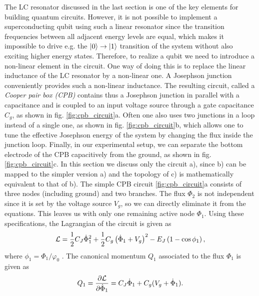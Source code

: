 The LC resonator discussed in the last section is one of the key elements for building quantum circuits. However, it is not possible to implement a superconducting qubit using such a linear resonator since the transition frequencies between all adjacent energy levels are equal, which makes it impossible to drive e.g. the $\left| 0 \right>\to\left| 1 \right>$ transition of the system without also exciting higher energy states. Therefore, to realize a qubit we need to introduce a non-linear element in the circuit. One way of doing this is to replace the linear inductance of the LC resonator by a non-linear one. A Josephson junction conveniently provides such a non-linear inductance. The resulting circuit, called a {\it Cooper pair box (CPB)} contains thus a Josephson junction in parallel with a capacitance and is coupled to an input voltage source through a gate capacitance $C_g$, as shown in fig. \ref{fig:cpb_circuit}a. Often one also uses two junctions in a loop instead of a single one, as shown in fig. \ref{fig:cpb_circuit}b, which allows one to tune the effective Josephson energy of the system by changing the flux inside the junction loop. Finally, in our experimental setup, we can separate the bottom electrode of the CPB capacitively from the ground, as shown in fig. \ref{fig:cpb_circuit}c. In this section we discuss only the circuit a), since b) can be mapped to the simpler version a) and the topology of c) is mathematically equivalent to that of b). The simple CPB circuit \ref{fig:cpb_circuit}a consists of  three nodes (including ground) and two branches. The flux $\Phi_2$ is not independent since it is set by the voltage source $V_g$, so we can directly eliminate it from the equations. This leaves us with only one remaining active node $\Phi_1$. Using these specifications, the Lagrangian of the circuit is given as
%
\begin{equation}
\begin{mathcal}L\end{mathcal}=\frac{1}{2}C_J\dot{\Phi}_1^2+\frac{1}{2}C_g\left(\dot{\Phi}_1+V_g\right)^2-E_J\left(1-\cos{\phi_1}\right),
\end{equation}
%
where $\phi_1=\Phi_1/\varphi_0$ . The canonical momentum $Q_1$ associated to the flux $\Phi_1$ is given as
%
\begin{equation}
Q_1 = \frac{\partial \begin{mathcal}L\end{mathcal}}{\partial \dot{\Phi}_1} = C_J \dot{\Phi}_1+C_g(V_g+\dot{\Phi}_1). \label{eq:q_of_phi}
\end{equation}
